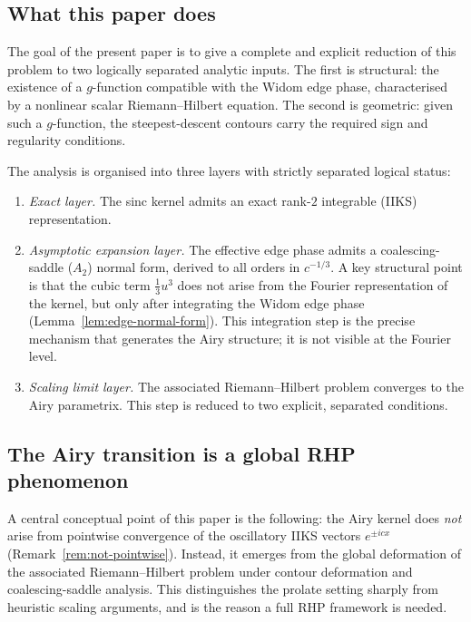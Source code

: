 \documentclass[12pt,a4paper]{amsart}
\theoremstyle{definition}
\theoremstyle{remark}
\begin{document}
\subsection*{What this paper does}

The goal of the present paper is to give a complete and explicit
reduction of this problem to two logically separated analytic inputs.
The first is structural: the existence of a $g$-function compatible
with the Widom edge phase, characterised by a nonlinear scalar
Riemann--Hilbert equation. The second is geometric: given such a
$g$-function, the steepest-descent contours carry the required
sign and regularity conditions.

The analysis is organised into three layers with strictly separated
logical status:
\begin{enumerate}[label=(\roman*)]
\item \emph{Exact layer.}
The sinc kernel admits an exact rank-$2$ integrable (IIKS) representation.

\item \emph{Asymptotic expansion layer.}
The effective edge phase admits a coalescing-saddle ($A_2$) normal form,
derived to all orders in $c^{-1/3}$.
A key structural point is that the cubic term $\frac{1}{3}u^3$ does not
arise from the Fourier representation of the kernel, but only after
integrating the Widom edge phase (Lemma~\ref{lem:edge-normal-form}).
This integration step is the precise mechanism that generates the
Airy structure; it is not visible at the Fourier level.

\item \emph{Scaling limit layer.}
The associated Riemann--Hilbert problem converges to the Airy
parametrix. This step is reduced to two explicit, separated conditions.
\end{enumerate}

\subsection*{The Airy transition is a global RHP phenomenon}

A central conceptual point of this paper is the following:
the Airy kernel does \emph{not} arise from pointwise convergence
of the oscillatory IIKS vectors $e^{\pm icx}$
(Remark~\ref{rem:not-pointwise}).
Instead, it emerges from the global deformation of the associated
Riemann--Hilbert problem under contour deformation and
coalescing-saddle analysis.
This distinguishes the prolate setting sharply from heuristic
scaling arguments, and is the reason a full RHP framework is needed.
\end{document}
